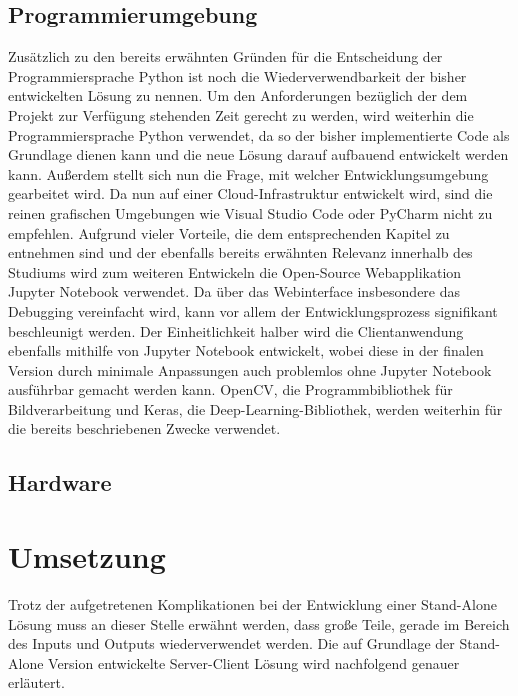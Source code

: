\documentclass[12pt, a4paper]{report}
\begin{document}
\subsection{Programmierumgebung}
Zusätzlich zu den bereits erwähnten Gründen für die Entscheidung der Programmiersprache Python ist noch die Wiederverwendbarkeit der bisher entwickelten Lösung zu nennen. Um den Anforderungen bezüglich der dem Projekt zur Verfügung stehenden Zeit gerecht zu werden, wird weiterhin die Programmiersprache Python verwendet, da so der bisher implementierte Code als Grundlage dienen kann und die neue Lösung darauf aufbauend entwickelt werden kann.
Außerdem stellt sich nun die Frage, mit welcher Entwicklungsumgebung gearbeitet wird. Da nun auf einer Cloud-Infrastruktur entwickelt wird, sind die reinen grafischen Umgebungen wie Visual Studio Code oder PyCharm nicht zu empfehlen. Aufgrund vieler Vorteile, die dem entsprechenden Kapitel zu entnehmen sind und der ebenfalls bereits erwähnten Relevanz innerhalb des Studiums wird zum weiteren Entwickeln die Open-Source Webapplikation Jupyter Notebook verwendet. Da über das Webinterface insbesondere das Debugging vereinfacht wird, kann vor allem der Entwicklungsprozess signifikant beschleunigt werden. Der Einheitlichkeit halber wird die Clientanwendung ebenfalls mithilfe von Jupyter Notebook entwickelt, wobei diese in der finalen Version durch minimale Anpassungen auch problemlos ohne Jupyter Notebook ausführbar gemacht werden kann. OpenCV, die Programmbibliothek für Bildverarbeitung und Keras, die Deep-Learning-Bibliothek, werden weiterhin für die bereits beschriebenen Zwecke verwendet.

\subsection{Hardware}


\section{Umsetzung}
Trotz der aufgetretenen Komplikationen bei der Entwicklung einer Stand-Alone Lösung muss an dieser Stelle erwähnt werden, dass große Teile, gerade im Bereich des Inputs und Outputs wiederverwendet werden. Die auf Grundlage der Stand-Alone Version entwickelte Server-Client Lösung wird nachfolgend genauer erläutert.
\end{document}
